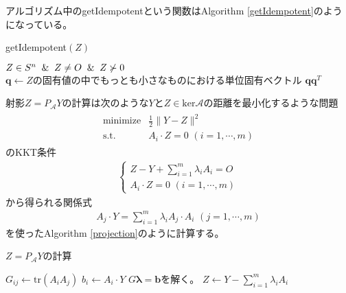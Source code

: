 アルゴリズム中のgetIdempotentという関数はAlgorithm \ref{getIdempotent}のようになっている。
\begin{algorithm}
  \caption{getIdempotent$\left(Z\right)$}
  \label{getIdempotent}
  \begin{algorithmic}[1]
    \Input $Z \in S^n \And Z \not= O \And Z \not\succ 0$
    \State $\mathbf{q} \leftarrow Z\text{の固有値の中でもっとも小さなものにおける単位固有ベクトル}$
    \State \Return $\mathbf{q} \mathbf{q}^T$
  \end{algorithmic}
\end{algorithm}

射影$Z = P_\mathcal{A} Y$の計算は次のような$Y$と$Z \in \mathrm{ker} \mathcal{A}$の距離を最小化するような問題
\begin{align*}
  \begin{array}{ll}
    \text{minimize} & \displaystyle{\frac{1}{2}} \|Y - Z\|^2 \\
    \text{s.t.}     & A_i \cdot Z = 0 \,\, \left(i = 1, \cdots, m\right)
  \end{array}
\end{align*}
のKKT条件
\begin{align*}
  \begin{cases}
    Z - Y + \displaystyle{\sum_{i = 1}^m} \lambda_i A_i = O \\
    A_i \cdot Z = 0 \,\, \left(i = 1, \cdots, m\right)
  \end{cases}
\end{align*}
から得られる関係式
\begin{align*}
  A_j \cdot Y = \displaystyle{\sum_{i = 1}^m} \lambda_i A_j \cdot A_i \,\, \left(j = 1, \cdots, m\right)
\end{align*}
を使ったAlgorithm \ref{projection}のように計算する。
\begin{algorithm}
  \caption{$Z = P_\mathcal{A} Y$の計算}
  \label{projection}
  \begin{algorithmic}[1]
        \State $G_{i j} \leftarrow \mathrm{tr}\left(A_i A_j\right)$
      \EndFor
    \EndFor
      \State $b_i \leftarrow A_i \cdot Y$
    \EndFor
    \State $G {\bm \lambda} = \mathbf{b}$を解く。
    \State \Return $Z \leftarrow Y - \displaystyle{\sum_{i = 1}^m \lambda_i A_i}$
  \end{algorithmic}
\end{algorithm}

